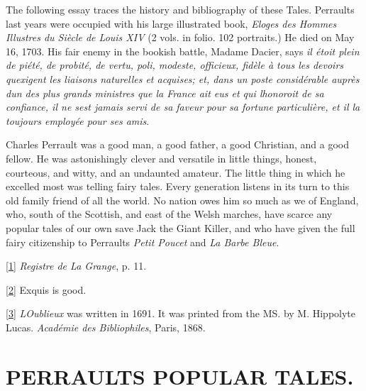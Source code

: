 \documentclass[14pt,a4paper]{memoir}
\begin{document}
The following essay traces the history and bibliography of these Tales.
Perrault\textquotesingle s last years were occupied with his large
illustrated book, \emph{Eloges des Hommes Illustres du Siècle de Louis
XIV} (2 vols. in folio. 102 portraits.) He died on May 16, 1703. His
fair enemy in the bookish battle, Madame Dacier, says
\textquotesingle{}\emph{il étoit plein de piété, de probité, de vertu,
poli, modeste, officieux, fidèle à tous les devoirs
qu\textquotesingle exigent les liaisons naturelles et acquises; et, dans
un poste considérable auprès d\textquotesingle un des plus grands
ministres que la France ait eus et qui l\textquotesingle honoroit de sa
confiance, il ne s\textquotesingle est jamais servi de sa faveur pour sa
fortune particulière, et il l\textquotesingle a toujours employée pour
ses amis}.\textquotesingle{}

Charles Perrault was a good man, a good father, a good Christian, and a
good fellow. He was astonishingly clever and versatile in little things,
honest, courteous, and witty, and an undaunted amateur. The little thing
in which he excelled most was telling fairy tales. Every generation
listens in its turn to this old family friend of all the world. No
nation owes him so much as we of England, who, south of the Scottish,
and east of the Welsh marches, have scarce any popular tales of our own
save Jack the Giant Killer, and who have given the full fairy
citizenship to Perrault\textquotesingle s \emph{Petit Poucet} and
\emph{La Barbe Bleue}.

\protect\hypertarget{4533318093929944247_33931-h-0.htm.xhtmlux5cux23Footnote_1}{}{}\protect\hyperlink{4533318093929944247_33931-h-0.htm.xhtmlux5cux23FNanchor_1}{{{[}1{]}}}
\emph{Registre de La Grange}, p. 11.

\protect\hypertarget{4533318093929944247_33931-h-0.htm.xhtmlux5cux23Footnote_2}{}{}\protect\hyperlink{4533318093929944247_33931-h-0.htm.xhtmlux5cux23FNanchor_2}{{{[}2{]}}}
\textquotesingle Exquis\textquotesingle{} is good.

\protect\hypertarget{4533318093929944247_33931-h-0.htm.xhtmlux5cux23Footnote_3}{}{}\protect\hyperlink{4533318093929944247_33931-h-0.htm.xhtmlux5cux23FNanchor_3}{{{[}3{]}}}
\emph{L\textquotesingle Oublieux} was written in 1691. It was printed
from the MS. by M. Hippolyte Lucas. \emph{Académie des Bibliophiles},
Paris, 1868.

\mainmatter

\part{PERRAULT\textquotesingle S POPULAR TALES.}
\end{document}
